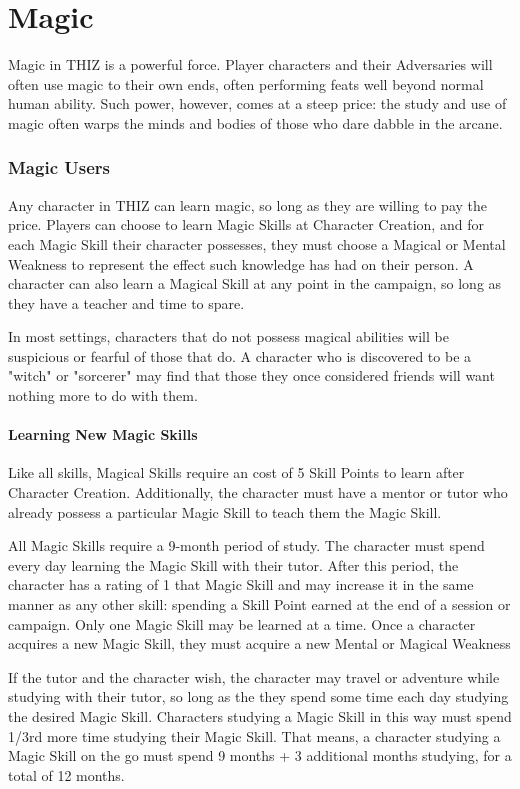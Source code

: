 \documentclass[oneside]{book}
\begin{document}
\chapter{Magic}
Magic in THIZ is a powerful force. Player characters and their Adversaries will often use magic to their own ends, often performing feats well beyond normal human ability. Such power, however, comes at a steep price: the study and use of magic often warps the minds and bodies of those who dare dabble in the arcane.

\begin{multicols}{2}
\subsection{Magic Users}
Any character in THIZ can learn magic, so long as they are willing to pay the price. Players can choose to learn Magic Skills at Character Creation, and for each Magic Skill their character possesses, they must choose a Magical or Mental Weakness to represent the effect such knowledge has had on their person. A character can also learn a Magical Skill at any point in the campaign, so long as they have a teacher and time to spare. 

In most settings, characters that do not possess magical abilities will be suspicious or fearful of those that do. A character who is discovered to be a "witch" or "sorcerer" may find that those they once considered friends will want nothing more to do with them.

\subsubsection{Learning New Magic Skills}
Like all skills, Magical Skills require an cost of 5 Skill Points to learn after Character Creation. Additionally, the character must have a mentor or tutor who already possess a particular Magic Skill to teach them the Magic Skill.

All Magic Skills require a 9-month period of study. The character must spend every day learning the Magic Skill with their tutor. After this period, the character has a rating of 1 that Magic Skill and may increase it in the same manner as any other skill: spending a Skill Point earned at the end of a session or campaign. Only one Magic Skill may be learned at a time. Once a character acquires a new Magic Skill, they must acquire a new Mental or Magical Weakness

If the tutor and the character wish, the character may travel or adventure while studying with their tutor, so long as the they spend some time each day studying the desired Magic Skill. Characters studying a Magic Skill in this way must spend 1/3rd more time studying their Magic Skill. That means, a character studying a Magic Skill on the go must spend 9 months + 3 additional months studying, for a total of 12 months. 


\end{multicols}
\end{document}
